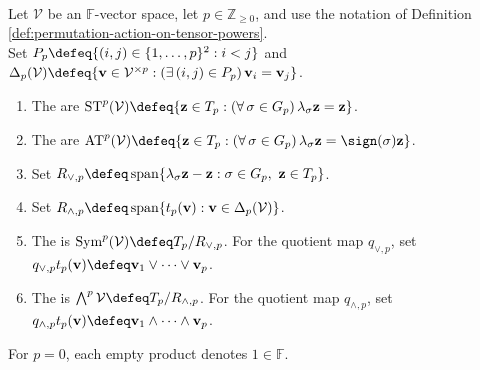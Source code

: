 \begin{definition} \label{def:symmetric-and-exterior-tensor-spaces} \\
Let $\mathcal{V}$ be an $\mathbb{F}$-vector space, let $p\in\mathbb{Z}_{\geq0}$, and use the notation of Definition \ref{def:permutation-action-on-tensor-powers}.\\
Set $P_p\defeq\{(i,j)\in\{1,\ldots,p\}^2:i<j\}$ and $\Delta_p(\mathcal{V})\defeq\{\mathbf{v}\in\mathcal{V}^{\times p}:(\exists\,(i,j)\in P_p)\,\mathbf{v}_i=\mathbf{v}_j\}$.
\begin{enumerate}[label=(\roman*)]
\setlength{\itemsep}{0pt}
\item The  are $\operatorname{ST}^{p}(\mathcal{V})\defeq\{\mathbf{z}\in T_p:(\forall\,\sigma\in G_p)\,\lambda_{\sigma}\mathbf{z}=\mathbf{z}\}$.
\item The  are $\operatorname{AT}^{p}(\mathcal{V})\defeq\{\mathbf{z}\in T_p:(\forall\,\sigma\in G_p)\,\lambda_{\sigma}\mathbf{z}=\sign(\sigma)\mathbf{z}\}$.
\item Set $R_{\vee,p}\defeq\operatorname{span}\{\lambda_{\sigma}\mathbf{z}-\mathbf{z}:\sigma\in G_p,\ \mathbf{z}\in T_p\}$.
\item Set $R_{\wedge,p}\defeq\operatorname{span}\{t_p(\mathbf{v}):\mathbf{v}\in\Delta_p(\mathcal{V})\}$.
\item The  is $\operatorname{Sym}^{p}(\mathcal{V})\defeq T_p/R_{\vee,p}$. For the quotient map $q_{\vee,p}$, set $q_{\vee,p}t_p(\mathbf{v})\defeq\mathbf{v}_1\vee\cdots\vee\mathbf{v}_p$.
\item The  is $\bigwedge^{p}\mathcal{V}\defeq T_p/R_{\wedge,p}$. For the quotient map $q_{\wedge,p}$, set $q_{\wedge,p}t_p(\mathbf{v})\defeq\mathbf{v}_1\wedge\cdots\wedge\mathbf{v}_p$.
\end{enumerate}
For $p=0$, each empty product denotes $1\in\mathbb{F}$.
\end{definition}

